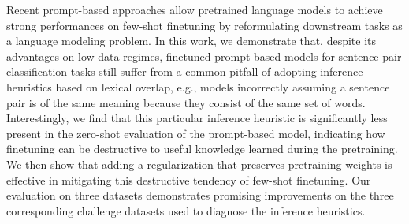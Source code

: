 Recent prompt-based approaches allow pretrained language models to achieve strong performances on few-shot finetuning by reformulating downstream tasks as a language modeling problem. In this work, we demonstrate that, despite its advantages on low data regimes, finetuned prompt-based models for sentence pair classification tasks still suffer from a common pitfall of adopting inference heuristics based on lexical overlap, e.g., models incorrectly assuming a sentence pair is of the same meaning because they consist of the same set of words. Interestingly, we find that this particular inference heuristic is significantly less present in the zero-shot evaluation of the prompt-based model, indicating how finetuning can be destructive to useful knowledge learned during the pretraining. We then show that adding a regularization that preserves pretraining weights is effective in mitigating this destructive tendency of few-shot finetuning. Our evaluation on three datasets demonstrates promising improvements on the three corresponding challenge datasets used to diagnose the inference heuristics.
